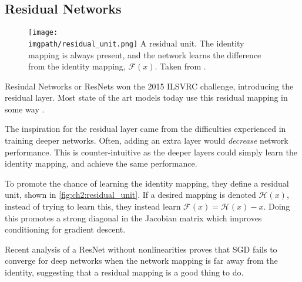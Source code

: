 \subsection{Residual Networks}\label{sec:ch2:resnets}
  \begin{figure}[tb]
    \centering
    \texttt{[image: \\imgpath/residual\_unit.png]}
          {A residual unit. The identity mapping is always present, and the
            network learns the difference from the identity mapping, $\mathcal{F}(x)$.
            Taken from \cite{he_deep_2016}.}
      \label{fig:ch2:residual_unit}
  \end{figure}
  Resiudal Networks or ResNets won the 2015 ILSVRC challenge, introducing the
  residual layer. Most state of the art models today use this residual mapping
  in some way \cite{zagoruyko_wide_2016-1, xie_aggregated_2017}.

  The inspiration for the residual layer came from the difficulties
  experienced in training deeper networks. Often, adding an extra layer would
  \emph{decrease} network performance. This is counter-intuitive as the deeper
  layers could simply learn the identity mapping, and achieve the same
  performance.

  To promote the chance of learning the identity mapping, they define a residual
  unit, shown in \autoref{fig:ch2:residual_unit}. If a desired mapping is
  denoted $\mathcal{H}(x)$, instead of trying to learn this, they instead learn
  $\mathcal{F}(x) = \mathcal{H}(x) - x$. Doing this promotes a strong diagonal
  in the Jacobian matrix which improves conditioning for gradient descent. 
  
  Recent analysis of a ResNet without nonlinearities
  \cite{bartlett_representing_2018, bartlett_gradient_2018} proves that SGD
  fails to converge for deep networks when the network mapping is far away from
  the identity, suggesting that a residual mapping is a good thing to do.
